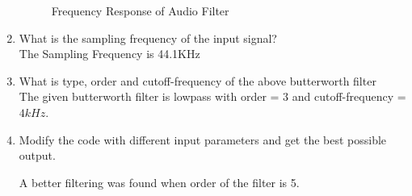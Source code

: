 \documentclass[journal,12pt,twocolumn]{IEEEtran}
\theoremstyle{remark}
\renewcommand\thesection{\arabic{section}}
\numberwithin{equation}{subsection}
\begin{document}
\begin{enumerate}[label=\thesection.\arabic*]
\begin{figure}[H]
\caption{Frequency Response of Audio Filter}
\label{fig:H(w)}
\end{figure}

\item What is the sampling frequency of the input signal?\\
\solution The Sampling Frequency is 44.1KHz
\item
What is type, order and  cutoff-frequency of the above butterworth filter
\\
\solution The given butterworth filter is lowpass with order = $3$ and cutoff-frequency = $4kHz$.

\item
Modify the code with different input parameters and get the best possible output.

\solution
A better filtering was found when order of the filter is 5.

\end{enumerate}
\end{document}
